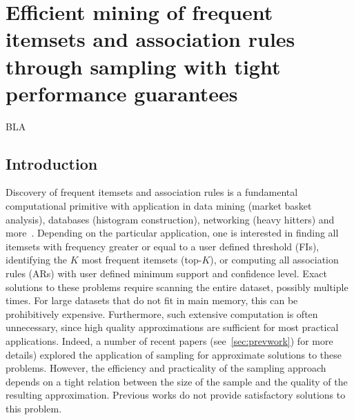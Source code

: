 \chapter{Efficient mining of frequent itemsets and association rules through
sampling with tight performance guarantees}\label{ch:vcmine}
BLA

\section{Introduction}\label{sec:intro}
Discovery of frequent itemsets and association rules is a fundamental
computational primitive with application in data mining (market basket
analysis), databases (histogram construction), networking (heavy hitters) and
more~\cite[Sect.~5]{HanCXY07}. Depending on the particular application, one is
interested in finding all itemsets with frequency greater or equal to a user
defined threshold (FIs), identifying the $K$ most frequent itemsets (top-$K$),
or computing all association rules (ARs) with user defined minimum  support and
confidence level. Exact solutions to these problems require scanning the entire
dataset, possibly multiple times. For large datasets that do not fit in main
memory, this can be prohibitively expensive. Furthermore, such extensive
computation is often unnecessary, since high quality approximations are
sufficient for most practical applications.  Indeed, a number of recent
papers (see~\ref{sec:prevwork}) for more details)
explored the application of sampling for approximate solutions to these
problems. However, the efficiency and practicality of the sampling approach
depends on a tight relation between the size of the sample and the quality of
the resulting approximation. Previous works do not provide satisfactory
solutions to this problem.

